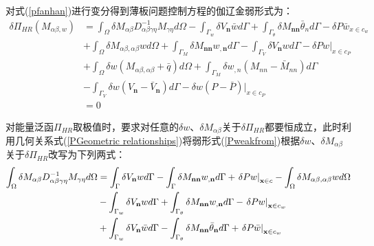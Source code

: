 对式(\ref{pfanhan})进行变分得到薄板问题控制方程的伽辽金弱形式为：
\begin{equation}\label{Pweakfrom}
\begin{split}
    \delta\Pi_{H\!R}(M_{\alpha\beta,w})&=\int_{\Omega}\delta M_{\alpha\beta}D^{-1}_{\alpha\beta\gamma\eta}M_{\gamma\eta}d\Omega-\int_{\Gamma_w}\delta V_{\pmb n}\bar{w}d\Gamma+\int_{\Gamma_{\theta}}\delta M_{\pmb{nn}}\bar{\theta}_nd\Gamma-\delta P\bar{w}_{x\in{c_w}}\\
    &+\int_{\Omega}\delta M_{\alpha\beta,\alpha\beta}wd\Omega+\int_{\Gamma_M}\delta M_{\pmb{nn}}w_{,\pmb n}d\Gamma-\int_{\Gamma_V}\delta V_{\pmb n}wd\Gamma-\delta Pw\vert_{x\in{c_P}}\\
    &+\int_{\Omega}\delta w(M_{\alpha\beta,\alpha\beta}+\bar{q})d\Omega+\int_{\Gamma_M}\delta w_{,n}(M_{nn}-\bar{M}_{nn})d\Gamma\\
    &-\int_{\Gamma_V}\delta w(V_{\pmb n}-\bar{V}_{\pmb n})d\Gamma-\delta w(P-\bar{P})\vert_{x\in{c_P}}\\
    &=0
\end{split}
\end{equation}\par
对能量泛函$\Pi_{H\!R}$取极值时，要求对任意的$\delta w$、$\delta M_{\alpha\beta}$关于$\delta\Pi_{H\!R}$都要恒成立，此时利用几何关系式(\ref{PGeometric relationships})将弱形式(\ref{Pweakfrom})根据$\delta w$、$\delta M_{\alpha\beta}$关于$\delta\Pi_{H\!R}$改写为下列两式：
\begin{equation}\label{Pweakform1}
    \begin{split}
        \int_\Omega {\delta {M_{\alpha \beta }}D_{\alpha \beta \gamma \eta }^{ - 1}{M_{\gamma \eta }}d\Omega }&=\int_\Gamma  {\delta {V_{\bf{n}}}wd\Gamma }  - \int_\Gamma  {\delta {M_{{\bf{nn}}}}{w_{,{\bf{n}}}}d\Gamma }+{\left. {\delta Pw} \right|_{{\bf{x}} \in c}} - \int_\Omega  {\delta {M_{\alpha \beta ,\alpha \beta }}wd\Omega } \\
        &-\int_{{\Gamma _w}} {\delta {V_{\bf{n}}}wd\Gamma }  + \int_{{\Gamma _\theta }} {\delta {M_{{\bf{nn}}}}{w_{,{\bf{n}}}}d\Gamma }  - {\left. {\delta Pw} \right|_{{\bf{x}} \in {c_w}}}\\
        &+\int_{{\Gamma _w}} {\delta {V_{\bf{n}}}\bar wd\Gamma }  - \int_{{\Gamma _\theta }} {\delta {M_{{\bf{nn}}}}{{\bar \theta }_{\bf{n}}}d\Gamma }  + {\left. {\delta P\bar w} \right|_{{\bf{x}} \in {c_w}}}
    \end{split}
\end{equation}
